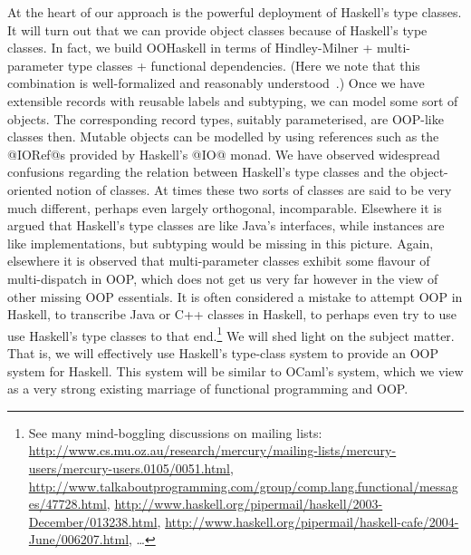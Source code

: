 At the heart of our approach is the powerful deployment of Haskell's
type classes. It will turn out that we can provide object classes
because of Haskell's type classes. In fact, we build OOHaskell in
terms of Hindley-Milner + multi-parameter type classes + functional
dependencies. (Here we note that this combination is well-formalized
and reasonably understood~\cite{SS04}.) Once we have extensible
records with reusable labels and subtyping, we can model some sort of
objects. The corresponding record types, suitably parameterised, are
OOP-like classes then. Mutable objects can be modelled by using
references such as the @IORef@s provided by Haskell's @IO@ monad.
We have observed widespread confusions regarding the relation between
Haskell's type classes and the object-oriented notion of classes. At
times these two sorts of classes are said to be very much different,
perhaps even largely orthogonal, incomparable. Elsewhere it is argued
that Haskell's type classes are like Java's interfaces, while
instances are like implementations, but subtyping would be missing in
this picture.  Again, elsewhere it is observed that multi-parameter
classes exhibit some flavour of multi-dispatch in OOP, which does not
get us very far however in the view of other missing OOP
essentials. It is often considered a mistake to
attempt OOP in Haskell, to transcribe Java or C++ classes in Haskell,
to perhaps even try to use use Haskell's type classes to that
end.\footnote{See many mind-boggling discussions on mailing lists:
\url{http://www.cs.mu.oz.au/research/mercury/mailing-lists/mercury-users/mercury-users.0105/0051.html},
\url{http://www.talkaboutprogramming.com/group/comp.lang.functional/messages/47728.html},
\url{http://www.haskell.org/pipermail/haskell/2003-December/013238.html},
\url{http://www.haskell.org/pipermail/haskell-cafe/2004-June/006207.html},
\ldots } We will shed light on the subject matter. That is, we will
effectively use Haskell's type-class system to provide an OOP system
for Haskell. This system will be similar to OCaml's system, which we
view as a very strong existing marriage of functional programming and
OOP.






